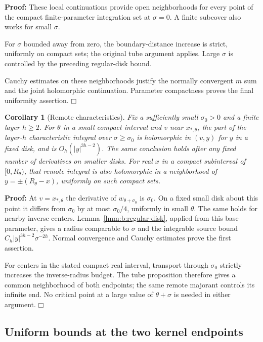 \documentclass[a4paper,10pt]{article}
\numberwithin{equation}{section}
\theoremstyle{paperplain}
\newtheorem{crl}[thm]{Corollary}
\theoremstyle{paperremark}
\theoremstyle{paperplain}
\newenvironment{prf}{\noindent \textbf{Proof: }}{\hfill $\mdlgwhtsquare$\par\addvspace{0.5\baselineskip}}
\begin{document}
\begin{prf}
These local continuations provide open neighborhoods for every point of
the compact finite-parameter integration set at $\sigma=0$. A finite
subcover also works for small $\sigma$.

For $\sigma$ bounded away from zero,
the boundary-distance increase is strict, uniformly on compact
sets; the original tube argument applies. Large $\sigma$ is
controlled by the preceding regular-disk bound.

Cauchy estimates on
these neighborhoods justify the normally convergent $m$ sum and
the joint holomorphic continuation. Parameter compactness proves
the final uniformity assertion.
\end{prf}

\begin{crl}[Remote characteristics]\label{crl:b:remote}
Fix a sufficiently small $\sigma_0>0$ and a finite layer $h\geq2$.
For $\theta$ in a small compact interval and $v$ near
$x_{*,\theta}$, the part of the layer-$h$ characteristic integral
over $\sigma\geq\sigma_0$ is holomorphic in $(v,y)$ for $y$ in
a fixed disk, and is $O_h(|y|^{3h-2})$. The same conclusion holds
after any fixed number of derivatives on smaller disks.
For real $x$ in a compact subinterval of $[0,R_\theta)$, that
remote integral is also holomorphic in a neighborhood of
$y=\pm(R_\theta-x)$, uniformly on such compact sets.
\end{crl}
\begin{prf}
At $v=x_{*,\theta}$ the derivative of $w_{\theta+\sigma_0}$ is
$\sigma_0$. On a fixed small disk about this point it differs
from $\sigma_0$ by at most $\sigma_0/4$, uniformly in small
$\theta$. The same holds for nearby inverse centers.
Lemma~\ref{lmm:b:regular-disk}, applied from this base parameter,
gives a radius comparable to $\sigma$ and the integrable source
bound $C_h|y|^{3h-2}\sigma^{-2h}$. Normal convergence and Cauchy
estimates prove the first assertion.

For centers in the stated compact real interval, transport through
$\sigma_0$ strictly increases the inverse-radius budget. The tube
proposition therefore gives a common neighborhood of both endpoints;
the same remote majorant controls its infinite end. No critical point
at a large value of $\theta+\sigma$ is needed in either argument.
\end{prf}

\subsection{Uniform bounds at the two kernel endpoints}
\label{subsec:b:endpoints}
\end{document}
